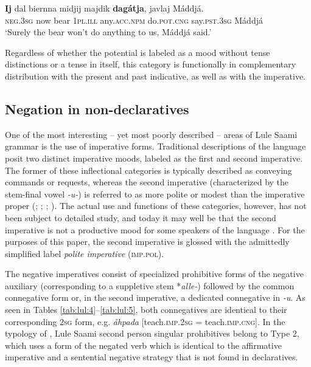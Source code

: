 \documentclass[output=paper,colorlinks,citecolor=brown]{langscibook}
\begin{document}
\ea\label{ex:lul:ii}
\gll \textbf{Ij} dal biernna midjij majdik \textbf{dagátja}, javlaj Máddjá.\\
    \textsc{neg.3sg} now bear \textsc{1pl.ill} any.\textsc{acc.npm} do.\textsc{pot.cng} say.\textsc{pst.3sg} Máddjá \\
    \glt ‘Surely the bear won’t do anything to us, Máddjá said.’  \citep{SIKOR2021}\\
\z 


Regardless of whether the potential is labeled as a mood without tense distinctions or a tense in itself, this category is functionally in complementary distribution with the present and past indicative, as well as with the imperative.

\subsection{Negation in non-declaratives} \label{sec:lul:2.2}

One of the most interesting – yet most poorly described – areas of Lule Saami grammar is the use of imperative forms. Traditional descriptions of the language posit two distinct imperative moods, labeled as the first and second imperative. 
The former of these inflectional categories is typically described as conveying commands or requests, whereas the second imperative (characterized by the stem-final vowel \textit{{}-u-}) is referred to as more polite or modest than the imperative proper (\citealt[279]{Wiklund1891}; \citeyear[114]{Wiklund1915}; \citealt[1851]{Grundström1946}; \citealt[103]{Spiik1989}). The actual use and functions of these categories, however, has not been subject to detailed study, and today it may well be that the second imperative is not a productive mood for some speakers of the language \citep[139]{Ylikoski2022}. For the purposes of this paper, the second imperative is glossed with the admittedly simplified label \textit{polite imperative} (\textsc{imp.pol}).

The negative imperatives consist of specialized prohibitive forms of the negative auxiliary (corresponding to a suppletive stem *\textit{alle-}) followed by the common connegative form or, in the second imperative, a dedicated connegative in \textit{{}-u}. As seen in Tables \ref{tab:lul:4}--\ref{tab:lul:5}, both connegatives are identical to their corresponding \textsc{2sg} form, e.g. \textit{åhpada} [teach.\textsc{imp.2sg} = teach.\textsc{imp.cng}].
In the typology of \citet{AuweraEtAl2013}, Lule Saami second person singular prohibitives belong to Type 2, which uses a form of the negated verb which is identical to the affirmative imperative and a sentential negative strategy that is not found in declaratives.
\end{document}
